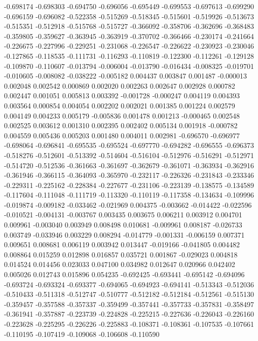 -0.698174
-0.698303
-0.694750
-0.696056
-0.695449
-0.699553
-0.697613
-0.699290
-0.696159
-0.696082
-0.522358
-0.515269
-0.518345
-0.515601
-0.519926
-0.513673
-0.515351
-0.512918
-0.515768
-0.515727
-0.366092
-0.358706
-0.362696
-0.368483
-0.359805
-0.359627
-0.363945
-0.363919
-0.370702
-0.366466
-0.230174
-0.241664
-0.226675
-0.227996
-0.229251
-0.231068
-0.226547
-0.226622
-0.230923
-0.230046
-0.127865
-0.118535
-0.111731
-0.116293
-0.110819
-0.122300
-0.112261
-0.129128
-0.109870
-0.110607
-0.013794
-0.006004
-0.013790
-0.016434
-0.008325
-0.019701
-0.010605
-0.008082
-0.038222
-0.005182
0.004437
0.003847
0.001487
-0.000013
0.002048
0.002542
0.000869
0.002020
0.002263
0.002647
0.002928
0.000782
0.002447
0.001051
0.005813
0.003392
-0.001728
-0.000247
0.004119
0.004393
0.003564
0.000854
0.004054
0.002202
0.002021
0.001385
0.001224
0.002579
0.004149
0.004233
0.005179
-0.005836
0.001478
0.001213
-0.000465
0.002548
0.002525
0.003612
0.001310
0.002395
0.002402
0.005134
0.001918
-0.000782
0.004559
0.005436
0.005203
0.001480
0.004011
0.002981
-0.696570
-0.696977
-0.698064
-0.696841
-0.695535
-0.695524
-0.697770
-0.694282
-0.696555
-0.696373
-0.518276
-0.512601
-0.513392
-0.514604
-0.516104
-0.512976
-0.516291
-0.512971
-0.514720
-0.512536
-0.361663
-0.361697
-0.362679
-0.361071
-0.363934
-0.362916
-0.361946
-0.366115
-0.364093
-0.365970
-0.232117
-0.226326
-0.231843
-0.233346
-0.229311
-0.225162
-0.228384
-0.227677
-0.231106
-0.223139
-0.138575
-0.134589
-0.117604
-0.111048
-0.111719
-0.113320
-0.110119
-0.117358
-0.134634
-0.109996
-0.019874
-0.009182
-0.033462
-0.021969
0.004375
-0.003662
-0.014422
-0.022596
-0.010521
-0.004131
-0.003767
0.003435
0.003675
0.006211
0.003912
0.004701
0.009961
-0.003040
0.003949
0.008498
0.010681
-0.009961
0.008187
-0.026733
0.003749
-0.033946
0.003229
0.008294
-0.014779
-0.001331
-0.006159
0.007371
0.009651
0.008681
0.006119
0.003942
0.013447
-0.019166
-0.041805
0.004482
0.008864
0.015259
0.012898
0.016857
0.035721
0.001867
-0.029023
0.004818
0.014524
0.014456
0.023033
0.047100
0.034982
0.012647
0.020966
0.042402
0.005026
0.012743
0.015896
0.054235
-0.692425
-0.693441
-0.695142
-0.694096
-0.693724
-0.693324
-0.693377
-0.694065
-0.694923
-0.694141
-0.513343
-0.512036
-0.510433
-0.511318
-0.512747
-0.510777
-0.512182
-0.512184
-0.512561
-0.515130
-0.359457
-0.357588
-0.357337
-0.359499
-0.357441
-0.357733
-0.357831
-0.358497
-0.361941
-0.357887
-0.223739
-0.224828
-0.225215
-0.227636
-0.226043
-0.226160
-0.223628
-0.225295
-0.226226
-0.225883
-0.108371
-0.108361
-0.107535
-0.107661
-0.110195
-0.107419
-0.109068
-0.106608
-0.110590
